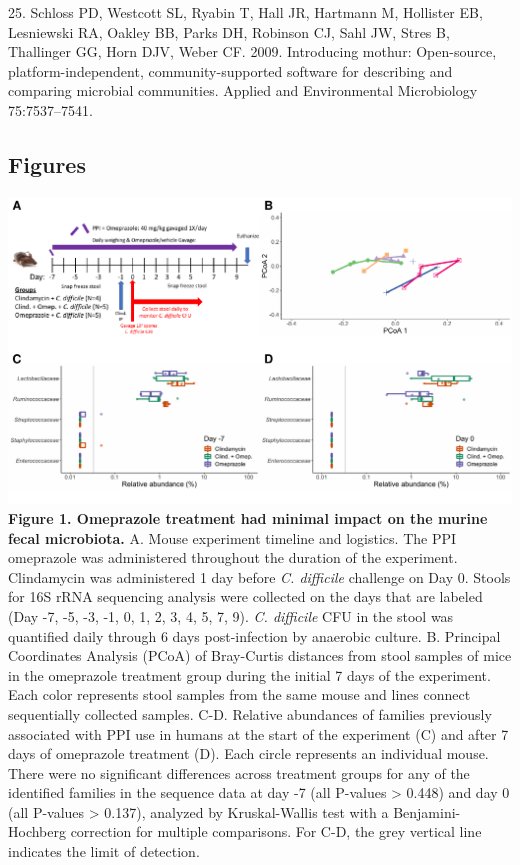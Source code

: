 \documentclass[11pt,]{article}
\begin{document}
\hypertarget{ref-Schloss2009}{}
25. Schloss PD, Westcott SL, Ryabin T, Hall JR, Hartmann M, Hollister
EB, Lesniewski RA, Oakley BB, Parks DH, Robinson CJ, Sahl JW, Stres B,
Thallinger GG, Horn DJV, Weber CF. 2009. Introducing mothur:
Open-source, platform-independent, community-supported software for
describing and comparing microbial communities. Applied and
Environmental Microbiology 75:7537--7541.

\newpage

\subsection{Figures}\label{figures}

\includegraphics{figure_1.pdf} \textbf{Figure 1. Omeprazole treatment
had minimal impact on the murine fecal microbiota.} A. Mouse experiment
timeline and logistics. The PPI omeprazole was administered throughout
the duration of the experiment. Clindamycin was administered 1 day
before \emph{C. difficile} challenge on Day 0. Stools for 16S rRNA
sequencing analysis were collected on the days that are labeled (Day -7,
-5, -3, -1, 0, 1, 2, 3, 4, 5, 7, 9). \emph{C. difficile} CFU in the
stool was quantified daily through 6 days post-infection by anaerobic
culture. B. Principal Coordinates Analysis (PCoA) of Bray-Curtis
distances from stool samples of mice in the omeprazole treatment group
during the initial 7 days of the experiment. Each color represents stool
samples from the same mouse and lines connect sequentially collected
samples. C-D. Relative abundances of families previously associated with
PPI use in humans at the start of the experiment (C) and after 7 days of
omeprazole treatment (D). Each circle represents an individual mouse.
There were no significant differences across treatment groups for any of
the identified families in the sequence data at day -7 (all P-values
\textgreater{} 0.448) and day 0 (all P-values \textgreater{} 0.137),
analyzed by Kruskal-Wallis test with a Benjamini-Hochberg correction for
multiple comparisons. For C-D, the grey vertical line indicates the
limit of detection.
\end{document}

